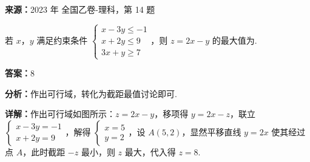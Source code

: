 \begin{question}[points=5]
\textbf{来源：}2023 年 全国乙卷-理科，第 14 题\par
若 $x$，$y$ 满足约束条件 $\begin{cases} x-3y\le -1 \\ x+2y\le 9 \\ 3x+y\ge 7 \end{cases}$，则 $z=2x-y$ 的最大值为.
\fillin[{$8$}]
\begin{solution}
\textbf{答案：}$8$

\textbf{分析：}作出可行域，转化为截距最值讨论即可.

\textbf{详解：}作出可行域如图所示：$z=2x-y$，移项得 $y=2x-z$，联立 $\begin{cases} x-3y=-1 \\ x+2y=9 \end{cases}$，解得 $\begin{cases} x=5 \\ y=2 \end{cases}$，设 $A(5,2)$，显然平移直线 $y=2x$ 使其经过点 $A$，此时截距 $-z$ 最小，则 $z$ 最大，代入得 $z=8$.
\end{solution}
\end{question}

